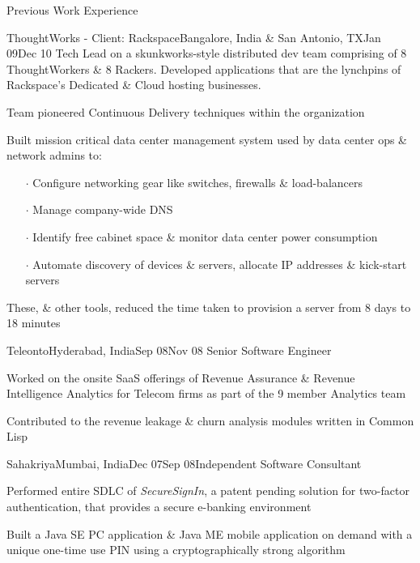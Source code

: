 \documentclass{resume} %
\begin{document}
\begin{rSection}{Previous Work Experience}

\begin{rSubsection}{ThoughtWorks - Client: Rackspace}{Bangalore, India \& San Antonio,
  TX}{Jan 09}{Dec
    10}
{Tech Lead on a skunkworks-style distributed dev team comprising of 8
  ThoughtWorkers \& 8 Rackers. Developed applications that are the
  lynchpins of Rackspace's Dedicated \& Cloud hosting businesses.}

\item Team pioneered Continuous Delivery techniques within the organization
\item Built mission critical data center management system used by
  data center ops \& network admins to:
\vspace{-0.5em}
\begin{itemize}  \itemsep0.5pt \parskip0pt
    \item[$\cdot$] Configure networking gear like switches, firewalls \& load-balancers
    \item[$\cdot$] Manage company-wide DNS
    \item[$\cdot$] Identify free cabinet space \& monitor data center power consumption
    \item[$\cdot$] Automate discovery of devices \& servers, allocate IP addresses \& kick-start servers
\end{itemize}
\item These, \& other tools, reduced the time taken to provision a server from 8 days to 18 minutes
\end{rSubsection}


\begin{rSubsection}{Teleonto}{Hyderabad, India}{Sep 08}{Nov 08}
{Senior Software Engineer}
\item Worked on the onsite SaaS offerings of Revenue Assurance \& Revenue Intelligence Analytics for Telecom firms as part of the 9 member Analytics team
\item Contributed to the revenue leakage \& churn analysis modules written in Common Lisp
\end{rSubsection}


\begin{rSubsection}{Sahakriya}{Mumbai, India}{Dec 07}{Sep 08}{Independent Software Consultant}
\item Performed entire SDLC of {\em SecureSignIn}, a patent pending solution for two-factor authentication, that provides a secure e-banking environment
\item Built a Java SE PC application \& Java ME mobile application on demand with a unique one-time use PIN using a cryptographically strong algorithm
\end{rSubsection}


\end{rSection}
\end{document}
